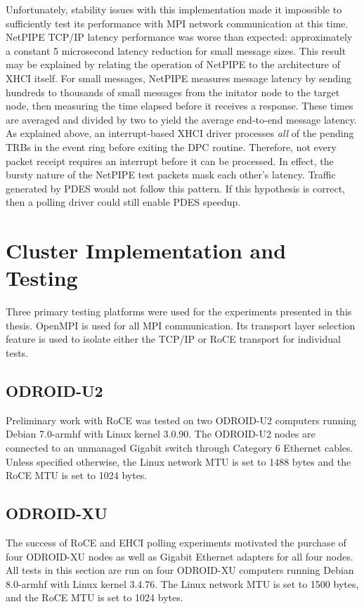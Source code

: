\documentclass[11pt]{book}
\begin{document}
Unfortunately, stability issues with this implementation made it impossible to
sufficiently test its performance with MPI network communication at this time.  NetPIPE
TCP/IP latency performance was worse than expected: approximately a constant 5 microsecond
latency reduction for small message sizes. This result may be explained by relating the
operation of NetPIPE to the architecture of XHCI itself.  For small messages, NetPIPE
measures message latency by sending hundreds to thousands of small messages from the
initator node to the target node, then measuring the time elapsed before it receives a
response. These times are averaged and divided by two to yield the average end-to-end
message latency. As explained above, an interrupt-based XHCI driver processes \emph{all}
of the pending TRBs in the event ring before exiting the DPC routine. Therefore, not every
packet receipt requires an interrupt before it can be processed. In effect, the bursty
nature of the NetPIPE test packets mask each other's latency. Traffic generated by PDES
would not follow this pattern. If this hypothesis is correct, then a polling driver could
still enable PDES speedup.

\chapter{Cluster Implementation and Testing}\label{cluster}

Three primary testing platforms were used for the experiments presented in this thesis.
OpenMPI is used for all MPI communication.  Its transport layer selection feature is used
to isolate either the TCP/IP or RoCE transport for individual tests.

\section{ODROID-U2}

Preliminary work with RoCE was tested on two ODROID-U2 computers running Debian 7.0-armhf
with Linux kernel 3.0.90.  The ODROID-U2 nodes are connected to an unmanaged Gigabit
switch through Category 6 Ethernet cables.  Unless specified otherwise, the Linux network
MTU is set to 1488 bytes and the RoCE MTU is set to 1024 bytes.

\section{ODROID-XU}

The success of RoCE and EHCI polling experiments motivated the purchase of four ODROID-XU
nodes as well as Gigabit Ethernet adapters for all four nodes.  All tests in this section
are run on four ODROID-XU computers running Debian 8.0-armhf with Linux kernel 3.4.76.
The Linux network MTU is set to 1500 bytes, and the RoCE MTU is set to 1024 bytes.
\end{document}
